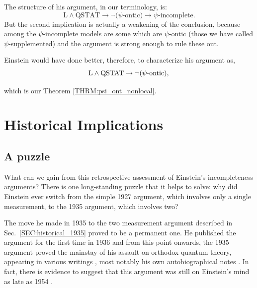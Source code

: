 \documentclass[aps,nofootinbib,12pt]{revtex4}
\begin{document}
The structure of his argument, in our terminology, is:
\begin{equation}
\text{L}\wedge\text{QSTAT}\rightarrow\lnot\text{(}\psi\text{-ontic)}%
\rightarrow\psi\text{-incomplete.}%
\end{equation}
But the second implication is actually a weakening of the
conclusion, because among the $\psi$-incomplete models are some
which are $\psi$-ontic (those we have called $\psi$-supplemented)
and the argument is strong enough to rule these out.

Einstein would have done better, therefore, to characterize his
argument as,
\[
\text{L}\wedge\text{QSTAT}\rightarrow\lnot \text{(}\psi\text{-ontic)},\\
\]

which is our Theorem \ref{THRM:psi_ont_nonlocal}.

\section{Historical Implications
\label{SEC:historical_implications}}

\subsection{A puzzle}
What can we gain from this retrospective assessment of Einstein's
incompleteness arguments? There is one long-standing puzzle that it
helps to solve: why did Einstein ever switch from the simple 1927
argument, which involves only a single measurement, to the 1935
argument, which involves two?

The move he made in 1935 to the two measurement argument described
in Sec.~\ref{SEC:historical_1935} proved to be a permanent one. He
published the argument for the first time in 1936 \cite{EPhysik} and
from this point onwards, the 1935 argument proved the mainstay of
his assault on orthodox quantum theory, appearing in various
writings \cite{Edialectica,EtoB}, most notably his own
autobiographical notes \cite{Eautobiog}. In fact, there is evidence
to suggest that this argument was still on Einstein's mind as late
as 1954 \cite{sauer}.

\end{document}
